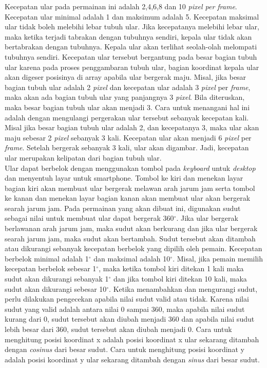 Kecepatan ular pada permainan ini adalah 2,4,6,8 dan 10 \textit{pixel per frame}. Kecepatan ular minimal adalah 1 dan maksimum adalah 5. Kecepatan maksimal ular tidak boleh melebihi lebar tubuh ular. Jika kecepatanya melebihi lebar ular, maka ketika terjadi tabrakan dengan tubuhnya sendiri, kepala ular tidak akan bertabrakan dengan tubuhnya. Kepala ular akan terlihat seolah-olah melompati tubuhnya sendiri. Kecepatan ular tersebut bergantung pada besar bagian tubuh ular karena pada proses penggambaran tubuh ular, bagian koordinat kepala ular akan digeser posisinya di array apabila ular bergerak maju. Misal, jika besar bagian tubuh ular adalah 2 \textit{pixel} dan kecepatan ular adalah 3 \textit{pixel} per \textit{frame}, maka akan ada bagian tubuh ular yang panjangnya 3 \textit{pixel}. Bila diteruskan, maka besar bagian tubuh ular akan menjadi 3. Cara untuk menangani hal ini adalah dengan mengulangi pergerakan ular tersebut sebanyak kecepatan kali. Misal jika besar bagian tubuh ular adalah 2, dan kecepatanya 3, maka ular akan maju sebesar 2 \textit{pixel} sebanyak 3 kali. Kecepatan ular akan menjadi 6 \textit{pixel} per \textit{frame}. Setelah bergerak sebanyak 3 kali, ular akan digambar. Jadi, kecepatan ular merupakan kelipatan dari bagian tubuh ular. \\

Ular dapat berbelok dengan menggunakan tombol pada \textit{keyboard} untuk \textit{desktop} dan menyentuh layar untuk smartphone. Tombol ke kiri dan menekan layar bagian kiri akan membuat ular bergerak melawan arah jarum jam serta tombol ke kanan dan menekan layar bagian kanan akan membuat ular akan bergerak searah jarum jam. Pada permainan yang akan dibuat ini, digunakan sudut sebagai nilai untuk membuat ular dapat bergerak 360$^\circ$. Jika ular bergerak berlawanan arah jarum jam, maka sudut akan berkurang dan jika ular bergerak searah jarum jam, maka sudut akan bertambah. Sudut tersebut akan ditambah atau dikurangi sebanyak kecepatan berbelok yang dipilih oleh pemain. Kecepatan berbelok minimal adalah 1$^\circ$ dan maksimal adalah 10$^\circ$. Misal, jika pemain memilih kecepatan berbelok sebesar 1$^\circ$, maka ketika tombol kiri ditekan 1 kali maka sudut akan dikurangi sebanyak 1$^\circ$ dan jika tombol kiri ditekan 10 kali, maka sudut akan dikurangi sebesar 10$^\circ$. Ketika menambahkan dan mengurangi sudut, perlu dilakukan pengecekan apabila nilai sudut valid atau tidak. Karena nilai sudut yang valid adalah antara nilai 0 sampai 360, maka apabila nilai sudut kurang dari 0, sudut tersebut akan diubah menjadi 360 dan apabila nilai sudut lebih besar dari 360, sudut tersebut akan diubah menjadi 0. Cara untuk menghitung posisi koordinat x adalah posisi koordinat x ular sekarang ditambah dengan \textit{cosinus} dari besar sudut. Cara untuk menghitung posisi koordinat y adalah posisi koordinat y ular sekarang ditambah dengan \textit{sinus} dari besar sudut.

